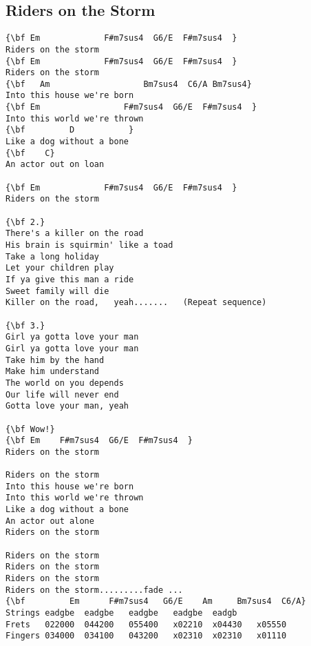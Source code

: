 \documentclass[a4paper]{article}
\begin{document}
\subsection{Riders on the Storm} %
\label{sub:Riders on the Storm}
\begin{Verbatim}[commandchars=\\\{\}]
{\bf Em             F#m7sus4  G6/E  F#m7sus4  }
Riders on the storm
{\bf Em             F#m7sus4  G6/E  F#m7sus4  }
Riders on the storm
{\bf   Am                   Bm7sus4  C6/A Bm7sus4}
Into this house we're born
{\bf Em                 F#m7sus4  G6/E  F#m7sus4  }
Into this world we're thrown
{\bf         D           }
Like a dog without a bone
{\bf    C}
An actor out on loan

{\bf Em             F#m7sus4  G6/E  F#m7sus4  }
Riders on the storm

{\bf 2.}
There's a killer on the road
His brain is squirmin' like a toad
Take a long holiday
Let your children play
If ya give this man a ride
Sweet family will die
Killer on the road,   yeah.......   (Repeat sequence)

{\bf 3.}
Girl ya gotta love your man
Girl ya gotta love your man
Take him by the hand
Make him understand
The world on you depends
Our life will never end
Gotta love your man, yeah

{\bf Wow!}
{\bf Em    F#m7sus4  G6/E  F#m7sus4  }
Riders on the storm

Riders on the storm
Into this house we're born
Into this world we're thrown
Like a dog without a bone
An actor out alone
Riders on the storm

Riders on the storm
Riders on the storm
Riders on the storm
Riders on the storm.........fade ...
{\bf         Em      F#m7sus4   G6/E    Am     Bm7sus4  C6/A}
Strings eadgbe  eadgbe   eadgbe   eadgbe  eadgb                             
Frets   022000  044200   055400   x02210  x04430   x05550
Fingers 034000  034100   043200   x02310  x02310   x01110
\end{Verbatim}
\newpage
\end{document}
